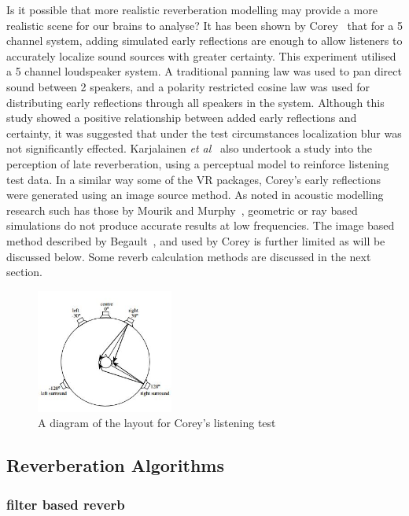 \documentclass[paper=a4, fontsize=10pt, font=arial]{scrartcl} %
\numberwithin{equation}{section} %
\numberwithin{figure}{section} %
\numberwithin{table}{section} %
\begin{document}
Is it possible that more realistic reverberation modelling may provide a more realistic scene for our brains to analyse? It has been shown by Corey~\cite{Corey2002} that for a 5 channel system, adding simulated early reflections are enough to allow listeners to accurately localize sound sources with greater certainty. This experiment utilised a 5 channel loudspeaker system. A traditional panning law was used to pan direct sound between 2 speakers, and a polarity restricted cosine law was used for distributing early reflections through all speakers in the system. Although this study showed a positive relationship between added early reflections and certainty, it was suggested that under the test circumstances localization blur was not significantly effected. Karjalainen \textit{et al}~\cite{Karjalainen2001} also undertook a study into the perception of late reverberation, using a perceptual model to reinforce listening test data. In a similar way some of the VR packages, Corey's early reflections were generated using an image source method. As noted in acoustic modelling research such has those by Mourik and Murphy~\cite{Mourik2013}, geometric or ray based simulations do not produce accurate results at low frequencies. The image based method described by Begault~\cite{Begault1995}, and used by Corey is further limited as will be discussed below. Some reverb calculation methods are discussed in the next section.

\begin{figure}[H]
\centering
\includegraphics[width=0.4\textwidth]{coreydiagram.jpg}
\caption{A diagram of the layout for Corey's listening test\cite{Corey2002}}
\end{figure}

\newpage
\subsection{Reverberation Algorithms}
\subsubsection{filter based reverb}
\end{document}
